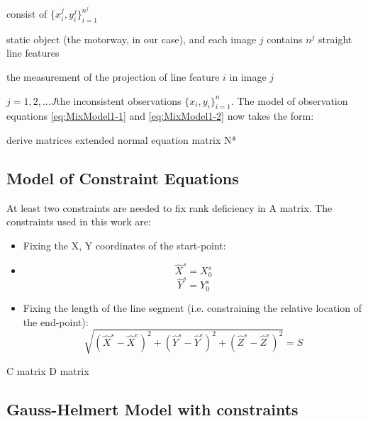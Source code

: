 consist of $\{x^j_i,y^j_i\}^{n^j}_{i=1}$

 static object (the motorway, in our case), and each image $j$ contains $n^j$ straight line features


the measurement of the projection of line feature $i$ in image $j$

$j=1,2,...J$the inconsistent observations $\{x_i,y_i\}^n_{i=1}$. The model of observation equations \eqref{eq:MixModel1-1} and \eqref{eq:MixModel1-2} now takes the form: 

derive matrices
extended normal equation matrix N*



\subsection{Model of Constraint Equations}
\label{subsec:ConEqua}
At least two constraints are needed to fix rank deficiency in A matrix. The constraints used in this work are:
\begin{itemize}
\item Fixing the X, Y coordinates of the start-point:
\item [] \begin{equation} \label{eq:constraint1}
\hat{X}^s=X^s_0
\end{equation}
\begin{equation} \label{eq:constraint2}
\hat{Y}^s=Y^s_0
\end{equation}
\item Fixing the length of the line segment (i.e. constraining the relative location of the end-point):
\begin{equation} \label{eq:constraint3}
\sqrt{(\hat{X}^s-\hat{X}^e)^2+(\hat{Y}^s-\hat{Y}^e)^2+(\hat{Z}^s-\hat{Z}^e)^2}=S
\end{equation}
\end{itemize}


C matrix
D matrix

\subsection{Gauss-Helmert Model with constraints}
\label{subsec:LSadj}



\clearpage
